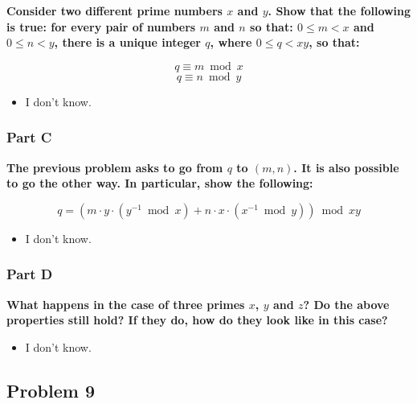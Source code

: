 \documentclass[11pt]{article}
\begin{document}
\textbf{Consider two different prime numbers $x$ and $y$. Show that the
following is true: for every pair of numbers $m$ and $n$ so that: $0
\leq m < x$ and $0 \leq n < y$, there is a unique integer $q$, where
$0 \leq q < xy$, so that:}

$$q \equiv m \bmod{x}$$
$$q \equiv n \bmod{y}$$

  \begin{itemize}
  
  \item I don't know.
  
  \end{itemize}
  
\subsubsection*{Part C}

\textbf{The previous problem asks to go from $q$ to $(m,n)$. It is also
possible to go the other way. In particular, show the following:}

$$q = ( m \cdot y \cdot (y^{-1} \bmod{x}) + n \cdot x \cdot
(x^{-1} \bmod{y}) ) \bmod{xy}$$

  \begin{itemize}
  
  \item I don't know.
  
  \end{itemize}

\subsubsection*{Part D} 

\textbf{What happens in the case of three primes $x$, $y$ and $z$? Do the
above properties still hold? If they do, how do they look like in this
case?}

  \begin{itemize}
  
  \item I don't know.
  
  \end{itemize}

\subsection*{Problem 9}
\end{document}
